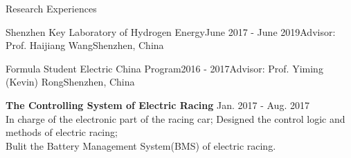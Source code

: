 \documentclass{resume} %
\begin{document}
\begin{rSection}{Research Experiences}
\begin{rSubsection}{Shenzhen Key Laboratory of Hydrogen Energy}{June 2017 - June 2019}{Advisor: Prof. Haijiang Wang}{Shenzhen, China}
    \end{rSubsection}



    \begin{rSubsection}{Formula Student Electric China Program}{2016 - 2017}{Advisor: Prof. Yiming (Kevin) Rong}{Shenzhen, China}
        \vspace{-4pt}
        \item \textbf{The Controlling System of Electric Racing}  \hfill { Jan. 2017 - Aug. 2017}\\
        In charge of the electronic part of the racing car;
        Designed the control logic and methods of electric racing;\\
        Bulit the Battery Management System(BMS) of electric racing.

    \end{rSubsection}
 
\end{rSection}
\end{document}
